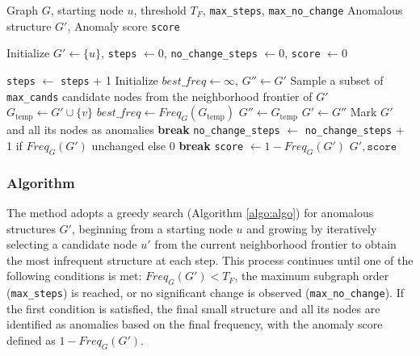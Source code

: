\documentclass[pdflatex,sn-mathphys-num]{sn-jnl}%
\theoremstyle{thmstyleone}%
\theoremstyle{thmstyletwo}%
\theoremstyle{thmstylethree}%
\begin{document}
\vspace*{-30pt}
\begin{algorithm}[H]
\caption{Greedy Search for Anomalous Structures}
\label{algo:algo}
\scriptsize
\begin{algorithmic}[1]
\REQUIRE Graph $G$, starting node $u$, threshold $T_F$, \texttt{max\_steps}, \texttt{max\_no\_change}
\ENSURE Anomalous structure $G'$, Anomaly score \texttt{score}

\STATE Initialize $G' \leftarrow \{u\}$, \texttt{steps} $\leftarrow 0$, \texttt{no\_change\_steps} $\leftarrow 0$, \texttt{score} $\leftarrow 0$

    \STATE \texttt{steps} $\leftarrow$ \texttt{steps} + 1
    \STATE Initialize $best\_freq \leftarrow \infty$, $G'' \leftarrow G'$
    \STATE Sample a subset of \texttt{max\_cands} candidate nodes from the neighborhood frontier of $G'$
        \STATE $G_{\text{temp}} \leftarrow G' \cup \{v\}$
            \STATE $best\_freq \leftarrow Freq_G(G_{\text{temp}})$
            \STATE $G'' \leftarrow G_{\text{temp}}$
        \ENDIF
    \ENDFOR
    \STATE $G' \leftarrow G''$
        \STATE Mark $G'$ and all its nodes as anomalies
        \STATE \textbf{break} 
    \ENDIF
    \STATE \texttt{no\_change\_steps} $\leftarrow$ \texttt{no\_change\_steps} + 1 if $Freq_G(G')$ unchanged else 0
        \STATE \textbf{break} 
    \ENDIF
\ENDWHILE
\STATE \texttt{score} $\leftarrow 1 - Freq_G(G')$
\RETURN $G', \texttt{score}$
\end{algorithmic}
\end{algorithm}

\vspace*{-30pt}

\subsubsection{Algorithm}
The method adopts a greedy search (Algorithm \ref{algo:algo}) for anomalous structures $G'$, beginning from a starting node $u$ and growing by iteratively selecting a candidate node $u'$ from the current neighborhood frontier to obtain the most infrequent structure at each step. This process continues until one of the following conditions is met: $Freq_G(G') < T_F$, the maximum subgraph order (\texttt{max\_steps}) is reached, or no significant change is observed (\texttt{max\_no\_change}). If the first condition is satisfied, the final small structure and all its nodes are identified as anomalies based on the final frequency, with the anomaly score defined as $1 - Freq_G(G')$.
\end{document}
